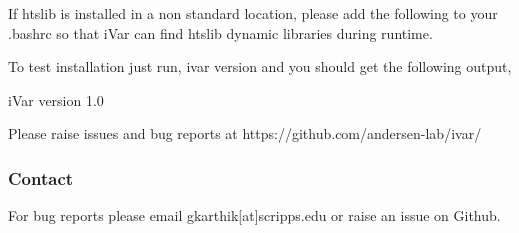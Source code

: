 If htslib is installed in a non standard location, please add the following to your .bashrc so that i\+Var can find htslib dynamic libraries during runtime.




To test installation just run, {\ttfamily ivar version} and you should get the following output,


\begin{DoxyCode}
iVar version 1.0

Please raise issues and bug reports at https://github.com/andersen-lab/ivar/
\end{DoxyCode}


\subsubsection*{Contact}

For bug reports please email gkarthik\mbox{[}at\mbox{]}scripps.\+edu or raise an issue on Github. 